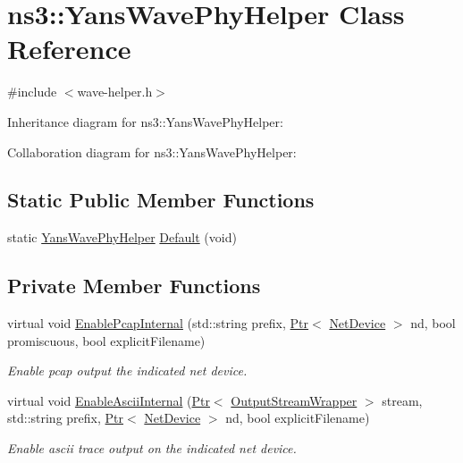 \hypertarget{classns3_1_1YansWavePhyHelper}{}\section{ns3\+:\+:Yans\+Wave\+Phy\+Helper Class Reference}
\label{classns3_1_1YansWavePhyHelper}


{\ttfamily \#include $<$wave-\/helper.\+h$>$}



Inheritance diagram for ns3\+:\+:Yans\+Wave\+Phy\+Helper\+:


Collaboration diagram for ns3\+:\+:Yans\+Wave\+Phy\+Helper\+:
\subsection*{Static Public Member Functions}
\begin{DoxyCompactItemize}
\item 
static \hyperlink{classns3_1_1YansWavePhyHelper}{Yans\+Wave\+Phy\+Helper} \hyperlink{classns3_1_1YansWavePhyHelper_a485a05f89d1f42783b96e99072b3aec3}{Default} (void)
\end{DoxyCompactItemize}
\subsection*{Private Member Functions}
\begin{DoxyCompactItemize}
\item 
virtual void \hyperlink{classns3_1_1YansWavePhyHelper_a6bcc70f08dc2e44676089f334c4345b0}{Enable\+Pcap\+Internal} (std\+::string prefix, \hyperlink{classns3_1_1Ptr}{Ptr}$<$ \hyperlink{classns3_1_1NetDevice}{Net\+Device} $>$ nd, bool promiscuous, bool explicit\+Filename)
\begin{DoxyCompactList}\small\item\em Enable pcap output the indicated net device. \end{DoxyCompactList}\item 
virtual void \hyperlink{classns3_1_1YansWavePhyHelper_ad015eeeabbdf7522d52de94d22fcc207}{Enable\+Ascii\+Internal} (\hyperlink{classns3_1_1Ptr}{Ptr}$<$ \hyperlink{classns3_1_1OutputStreamWrapper}{Output\+Stream\+Wrapper} $>$ stream, std\+::string prefix, \hyperlink{classns3_1_1Ptr}{Ptr}$<$ \hyperlink{classns3_1_1NetDevice}{Net\+Device} $>$ nd, bool explicit\+Filename)
\begin{DoxyCompactList}\small\item\em Enable ascii trace output on the indicated net device. \end{DoxyCompactList}\end{DoxyCompactItemize}
